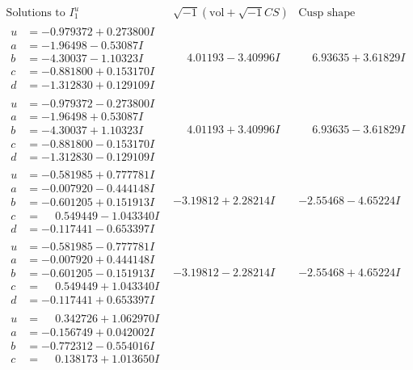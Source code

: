 \documentclass[1p]{elsarticle_modified}
\theoremstyle{definition}
\newcommand{\I}{\sqrt{-1}}
\begin{document}
$$\begin{array}{c|c|c}  
\text{Solutions to }I^u_{1}& \I (\text{vol} + \sqrt{-1}CS) & \text{Cusp shape}\\
 \hline 
\begin{aligned}
u &= -0.979372 + 0.273800 I \\
a &= -1.96498 - 0.53087 I \\
b &= -4.30037 - 1.10323 I \\
c &= -0.881800 + 0.153170 I \\
d &= -1.312830 + 0.129109 I\end{aligned}
 & \phantom{-}4.01193 - 3.40996 I & \phantom{-}6.93635 + 3.61829 I \\ \hline\begin{aligned}
u &= -0.979372 - 0.273800 I \\
a &= -1.96498 + 0.53087 I \\
b &= -4.30037 + 1.10323 I \\
c &= -0.881800 - 0.153170 I \\
d &= -1.312830 - 0.129109 I\end{aligned}
 & \phantom{-}4.01193 + 3.40996 I & \phantom{-}6.93635 - 3.61829 I \\ \hline\begin{aligned}
u &= -0.581985 + 0.777781 I \\
a &= -0.007920 - 0.444148 I \\
b &= -0.601205 + 0.151913 I \\
c &= \phantom{-}0.549449 - 1.043340 I \\
d &= -0.117441 - 0.653397 I\end{aligned}
 & -3.19812 + 2.28214 I & -2.55468 - 4.65224 I \\ \hline\begin{aligned}
u &= -0.581985 - 0.777781 I \\
a &= -0.007920 + 0.444148 I \\
b &= -0.601205 - 0.151913 I \\
c &= \phantom{-}0.549449 + 1.043340 I \\
d &= -0.117441 + 0.653397 I\end{aligned}
 & -3.19812 - 2.28214 I & -2.55468 + 4.65224 I \\ \hline\begin{aligned}
u &= \phantom{-}0.342726 + 1.062970 I \\
a &= -0.156749 + 0.042002 I \\
b &= -0.772312 - 0.554016 I \\
c &= \phantom{-}0.138173 + 1.013650 I \\

\end{aligned}
\end{array}$$
\end{document}
